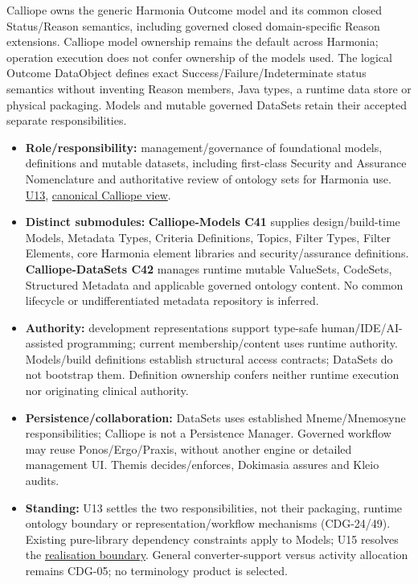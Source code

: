 Calliope owns the generic Harmonia Outcome model and its common closed Status/Reason semantics, including governed closed domain-specific Reason extensions. Calliope model ownership remains the default across Harmonia; operation execution does not confer ownership of the models used. The logical Outcome DataObject defines exact Success/Failure/Indeterminate status semantics without inventing Reason members, Java types, a runtime data store or physical packaging. Models and mutable governed DataSets retain their accepted separate responsibilities.



\begin{itemize}


\item \textbf{Role/responsibility:} management/governance of foundational models, definitions
  and mutable datasets, including first-class Security and Assurance Nomenclature
  and authoritative review of ontology sets for Harmonia use. \href{\detokenize{../../../../../../../../docs/markdown/05-information-systems-architecture/sources.md#u13}}{U13},
  \href{\detokenize{../../../../../../../../docs/markdown/05-information-systems-architecture/calliope-models-and-datasets.md}}{canonical Calliope view}.

\item \textbf{Distinct submodules:} \textbf{Calliope-Models C41} supplies design/build-time
  Models, Metadata Types, Criteria Definitions, Topics, Filter Types, Filter Elements,
  core Harmonia element libraries and security/assurance definitions.
  \textbf{Calliope-DataSets C42} manages runtime mutable ValueSets, CodeSets, Structured
  Metadata and applicable governed ontology content. No common lifecycle or
  undifferentiated metadata repository is inferred.

\item \textbf{Authority:} development representations support type-safe human/IDE/AI-assisted
  programming; current membership/content uses runtime authority. Models/build
  definitions establish structural access contracts; DataSets do not bootstrap them.
  Definition ownership confers neither runtime execution nor originating clinical authority.

\item \textbf{Persistence/collaboration:} DataSets uses established Mneme/Mnemosyne
  responsibilities; Calliope is not a Persistence Manager. Governed workflow may
  reuse Ponos/Ergo/Praxis, without another engine or detailed management UI.
  Themis decides/enforces, Dokimasia assures and Kleio audits.

\item \textbf{Standing:} U13 settles the two responsibilities, not their packaging, runtime
  ontology boundary or representation/workflow mechanisms (CDG-24/49). Existing
  pure-library dependency constraints apply to Models; U15 resolves the
  \href{\detokenize{../../../../../../../../docs/markdown/05-information-systems-architecture/calliope-models-and-datasets.md#calliope-realisation}}{realisation boundary}.
  General converter-support
  versus activity allocation remains CDG-05; no terminology product is selected.

\end{itemize}
